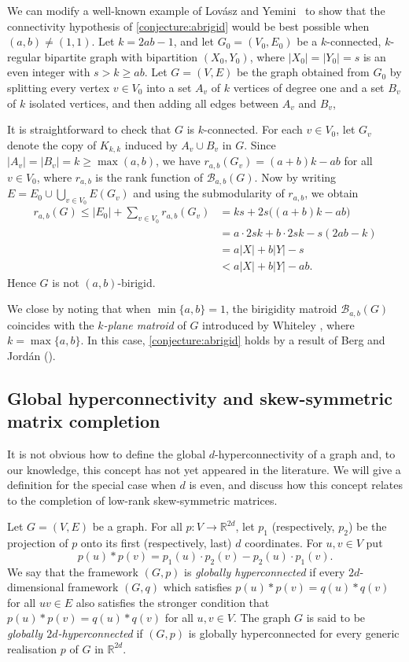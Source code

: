\documentclass[11pt,a4paper,dvipsnames]{scrartcl}
\newcommand{\R}{{\mathbb{R}}}
\newcommand{\cB}{{\mathcal{B}}}
\begin{document}
We can modify a well-known example of Lovász and Yemini~\cite{LY} to show that the connectivity hypothesis of \cref{conjecture:abrigid} would be best possible when $(a,b)\neq (1,1)$. 
Let $k = 2ab - 1$, and 
let $G_0 = (V_0,E_0)$ be a $k$-connected, $k$-regular bipartite graph with bipartition $(X_0,Y_0)$, where $|X_0|=|Y_0| = s$ is an even integer with $s > k \geq ab$.
Let $G = (V,E)$ be the graph obtained from $G_0$ by splitting every vertex $v \in V_0$ into a set $A_v$ of $k$ vertices of degree one and a set $B_v$ of $k$ isolated vertices, and then adding all edges between $A_v$ and $B_v$,

It is straightforward to check that $G$ is $k$-connected. For each $v \in V_0$, let $G_v$ denote the copy of $K_{k,k}$ induced by $A_v \cup B_v$ in $G$.
Since $|A_v| = |B_v| = k \geq \max(a,b)$, we have $r_{a,b}(G_v) = (a+b)k - ab$ 
for all $v \in V_0$, where $r_{a,b}$ is the rank function of $\cB_{a,b}(G)$. Now by writing $E = E_0 \cup \bigcup_{v \in V_0} E(G_v)$ and using the submodularity of $r_{a,b}$, we obtain
\begin{align*}
    r_{a,b}(G) \leq |E_0| + \sum_{v \in V_0} r_{a,b}(G_v) &= ks + 2s\big((a+b)k - ab\big) \\[-5mm] 
    &= a \cdot 2sk + b \cdot 2sk - s(2ab-k) \\ &= a|X| + b|Y| - s \\ &< a|X| + b|Y| - ab.
\end{align*}
Hence $G$ is not $(a,b)$-birigid.

We close by noting that when $\min\{a,b\} = 1$, the birigidity matroid $\cB_{a,b}(G)$ coincides with the \emph{$k$-plane matroid} of $G$ introduced by Whiteley \cite{Wscene}, where $k = \max\{a,b\}$. In this case, \cref{conjecture:abrigid} holds by a result of Berg and Jord\'an (\cite[Theorem 4]{BJ}).


\subsection{Global hyperconnectivity and skew-symmetric matrix completion}\label{sec:skew}

It is not obvious how to define the global $d$-hyperconnectivity of a graph and, to our knowledge, this concept has not yet appeared in the literature. We will give a definition for the special case when $d$ is even, and discuss how this concept relates to the completion of low-rank skew-symmetric matrices. 

Let $G=(V,E)$ be a graph. For all $p:V\to \R^{2d}$, let
$p_1$ (respectively, $p_2$) be the projection of $p$ onto its first (respectively, last) $d$ coordinates. For $u,v\in V$ put \[p(u)*p(v)=p_1(u)\cdot p_2(v)-p_2(u)\cdot p_1(v).\]   
We say that the framework $(G,p)$ is {\em globally hyperconnected} if every $2d$-dimensional framework $(G,q)$ which satisfies $p(u)*p(v)=q(u)*q(v)$ for all $uv\in E$ also satisfies the stronger condition that $p(u)*p(v)=q(u)*q(v)$ for all $u,v\in V$. 
The graph $G$ is said to be {\em globally $2d$-hyperconnected} if $(G,p)$ is globally hyperconnected for every generic realisation $p$ of $G$ in $\R^{2d}$.
\end{document}
